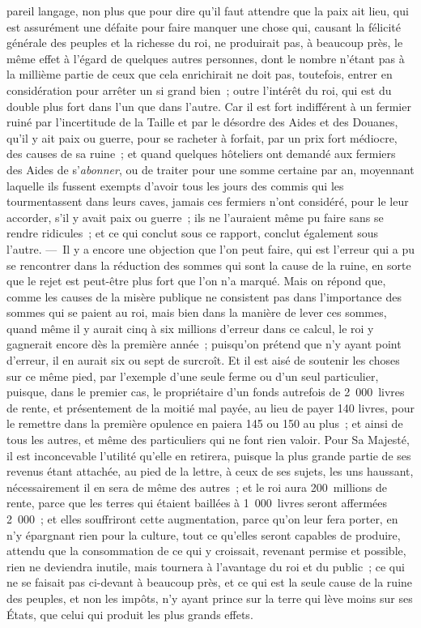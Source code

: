 \documentclass[french,twoside]{book} %
\begin{document}
pareil langage, non plus que pour dire qu’il faut attendre que la paix ait lieu, qui est assurément une défaite pour faire manquer une chose qui, causant la félicité générale des peuples et la richesse du roi, ne produirait pas, à beaucoup près, le même effet à l’égard de quelques autres personnes, dont le nombre n’étant pas à la millième partie de ceux que cela enrichirait ne doit pas, toutefois, entrer en considération pour arrêter un si grand bien ; outre l’intérêt du roi, qui est du double plus fort dans l’un que dans l’autre. Car il est fort indifférent à un fermier ruiné par l’incertitude de la Taille et par le désordre des Aides et des Douanes, qu’il y ait paix ou guerre, pour se racheter à forfait, par un prix fort médiocre, des causes de sa ruine ; et quand quelques hôteliers ont demandé aux fermiers des Aides de s’{\itshape abonner}, ou de traiter pour une somme certaine par an, moyennant laquelle ils fussent exempts d’avoir tous les jours des commis qui les tourmentassent dans leurs caves, jamais ces fermiers n’ont considéré, pour le leur accorder, s’il y avait paix ou guerre ; ils ne l’auraient même pu faire sans se rendre ridicules ; et ce qui conclut sous ce rapport, conclut également sous l’autre. — Il y a encore une objection que l’on peut faire, qui est l’erreur qui a pu se rencontrer dans la réduction des sommes qui sont la cause de la ruine, en sorte que le rejet est peut-être plus fort que l’on n’a marqué. Mais on répond que, comme les causes de la misère publique ne consistent pas dans l’importance des sommes qui se paient au roi, mais bien dans la manière de lever ces sommes, quand même il y aurait cinq à six millions d’erreur dans ce calcul, le roi y gagnerait encore dès la première année ; puisqu’on prétend que n’y ayant point d’erreur, il en aurait six ou sept de surcroît. Et il est aisé de soutenir les choses sur ce même pied, par l’exemple d’une seule ferme ou d’un seul particulier, puisque, dans le premier cas, le propriétaire d’un fonds autrefois de 2 000 livres de rente, et présentement de la moitié mal payée, au lieu de payer 140 livres, pour le remettre dans la première opulence en paiera 145 ou 150 au plus ; et ainsi de tous les autres, et même des particuliers qui ne font rien valoir. Pour Sa Majesté, il est inconcevable l’utilité qu’elle en retirera, puisque la plus grande partie de ses revenus étant attachée, au pied de la lettre, à ceux de ses sujets, les uns haussant, nécessairement il en sera de même des autres ; et le roi aura 200 millions de rente, parce que les terres qui étaient baillées à 1 000 livres seront affermées 2 000 ; et elles souffriront cette augmentation, parce qu’on leur fera porter, en n’y épargnant rien pour la culture, tout ce qu’elles seront capables de produire, attendu que la consommation de ce qui y croissait, revenant permise et possible, rien ne deviendra inutile, mais tournera à l’avantage du roi et du public ; ce qui ne se faisait pas ci-devant à beaucoup près, et ce qui est la seule cause de la ruine des peuples, et non les impôts, n’y ayant prince sur la terre qui lève moins sur ses États, que celui qui produit les plus grands effets.
\end{document}
